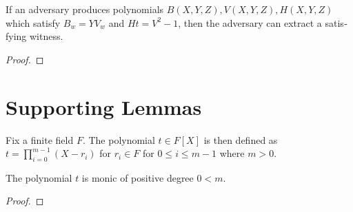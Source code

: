 \begin{theorem}\label{lem:knowledge_soundness}
\leanok
If an adversary produces polynomials $B(X,Y,Z), V(X,Y,Z), H(X,Y,Z)$ which satisfy $B_w = Y V_w$ and $H t = V^2 -1$, then the adversary can extract a satisfying witness.
\end{theorem}
\begin{proof}
\end{proof}

\chapter{Supporting Lemmas}\label{chap:supporting_lemmas}

\begin{definition}\label{def:poly_t}
\leanok
Fix a finite field $F$. The polynomial $t \in F[X]$ is then defined as $t = \prod_{i = 0}^{m - 1} (X - r_i)$ for $r_i \in F$ for $0 \leq i \leq m-1$ where $m > 0$.
\end{definition}

\begin{lemma}\label{lem:t_props}
\leanok
The polynomial $t$ is monic of positive degree $0 < m$.
\end{lemma}
\begin{proof}
\leanok
\end{proof}

\documentclass[a4paper]{report}

\usepackage[textwidth=14cm]{geometry}
\usepackage{xfrac}
\usepackage{polyglossia}
\setdefaultlanguage{english}

\usepackage{amsmath}
\usepackage{enumitem}
\usepackage{hyperref}

\usepackage{tikz-cd}

\usepackage[warnings-off={mathtools-colon,mathtools-overbracket}]{unicode-math}
\usepackage{fontspec}

\usepackage[nameinlink, capitalize]{cleveref}



\usepackage{amsthm}
\usepackage{etexcmds}
\usepackage{thmtools}



